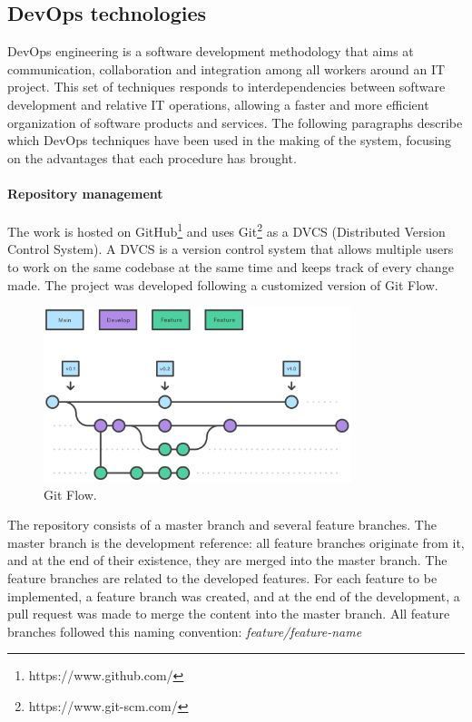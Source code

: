 \documentclass[12pt,a4paper,openright,twoside]{book}
\begin{document}
\subsection*{DevOps technologies}
DevOps engineering is a software development methodology that aims at communication, collaboration and integration among all workers around an IT project. 
This set of techniques responds to interdependencies between software development and relative IT operations, allowing a faster and more efficient organization of software products and services.
The following paragraphs describe which DevOps techniques have been used in the making of the system, focusing on the advantages that each procedure has brought.

\paragraph*{Repository management}
The work is hosted on GitHub\footnote{https://www.github.com/} and uses Git\footnote{https://www.git-scm.com/} as a DVCS (Distributed Version Control System).
A DVCS is a version control system that allows multiple users to work on the same codebase at the same time and keeps track of every change made.
The project was developed following a customized version of Git Flow. 

\begin{figure}[H]
  \centering
  \includegraphics[width=0.8\textwidth]{figures/gitflow.png}
  \caption{Git Flow.}
  \label{fig:git-flow}
\end{figure}

The repository consists of a master branch and several feature branches.
The master branch is the development reference: all feature branches originate from it, and at the end of their existence, they are merged into the master branch.
The feature branches are related to the developed features. 
For each feature to be implemented, a feature branch was created, and at the end of the development, a pull request was made to merge the content into the master branch.
All feature branches followed this naming convention: \textit{feature/{feature-name}}
\end{document}

